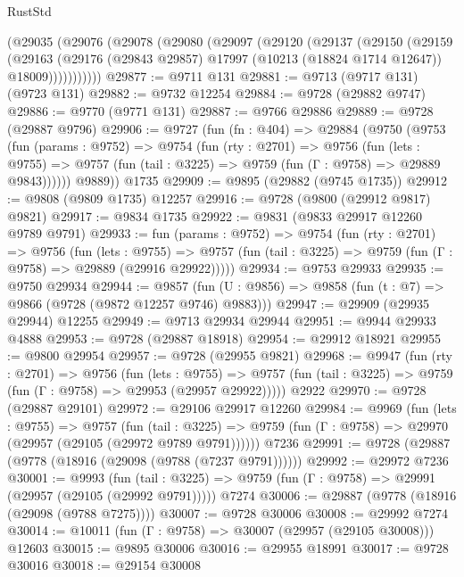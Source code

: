 \begin{lexlean}{RustStd}
\begin{coremodule}
    (@29035
      (@29076
        (@29078
          (@29080
            (@29097
              (@29120
                (@29137
                  (@29150
                    (@29159
                      (@29163
                        (@29176
                          (@29843 @29857)
                          @17997
                          (@10213 (@18824 @1714 @12647))
                          @18009)))))))))))
@29877 := @9711 @131
@29881 := @9713 (@9717 @131) (@9723 @131)
@29882 := @9732 @12254
@29884 := @9728 (@29882 @9747)
@29886 := @9770 (@9771 @131)
@29887 := @9766 @29886
@29889 := @9728 (@29887 @9796)
@29906 := @9727
    (fun (fn : @404) =>
    @29884
      (@9750
        (@9753
          (fun (params : @9752) =>
          @9754
            (fun (rty : @2701) =>
            @9756
              (fun (lets : @9755) =>
              @9757 (fun (tail : @3225) => @9759 (fun (Γ : @9758) => @29889 @9843))))))
        @9889))
    @1735
@29909 := @9895 (@29882 (@9745 @1735))
@29912 := @9808 (@9809 @1735) @12257
@29916 := @9728 (@9800 (@29912 @9817) @9821)
@29917 := @9834 @1735
@29922 := @9831 (@9833 @29917 @12260 @9789 @9791)
@29933 := fun (params : @9752) =>
  @9754
    (fun (rty : @2701) =>
    @9756
      (fun (lets : @9755) =>
      @9757 (fun (tail : @3225) => @9759 (fun (Γ : @9758) => @29889 (@29916 @29922)))))
@29934 := @9753 @29933
@29935 := @9750 @29934
@29944 := @9857
    (fun (U : @9856) => @9858 (fun (t : @7) => @9866 (@9728 (@9872 @12257 @9746) @9883)))
@29947 := @29909 (@29935 @29944) @12255
@29949 := @9713 @29934 @29944
@29951 := @9944 @29933 @4888
@29953 := @9728 (@29887 @18918)
@29954 := @29912 @18921
@29955 := @9800 @29954
@29957 := @9728 (@29955 @9821)
@29968 := @9947
    (fun (rty : @2701) =>
    @9756
      (fun (lets : @9755) =>
      @9757 (fun (tail : @3225) => @9759 (fun (Γ : @9758) => @29953 (@29957 @29922)))))
    @2922
@29970 := @9728 (@29887 @29101)
@29972 := @29106 @29917 @12260
@29984 := @9969
    (fun (lets : @9755) =>
    @9757
      (fun (tail : @3225) =>
      @9759 (fun (Γ : @9758) => @29970 (@29957 (@29105 (@29972 @9789 @9791))))))
    @7236
@29991 := @9728 (@29887 (@9778 (@18916 (@29098 (@9788 (@7237 @9791))))))
@29992 := @29972 @7236
@30001 := @9993
    (fun (tail : @3225) => @9759 (fun (Γ : @9758) => @29991 (@29957 (@29105 (@29992 @9791)))))
    @7274
@30006 := @29887 (@9778 (@18916 (@29098 (@9788 @7275))))
@30007 := @9728 @30006
@30008 := @29992 @7274
@30014 := @10011 (fun (Γ : @9758) => @30007 (@29957 (@29105 @30008))) @12603
@30015 := @9895 @30006
@30016 := @29955 @18991
@30017 := @9728 @30016
@30018 := @29154 @30008

\end{coremodule}
\end{lexlean}
